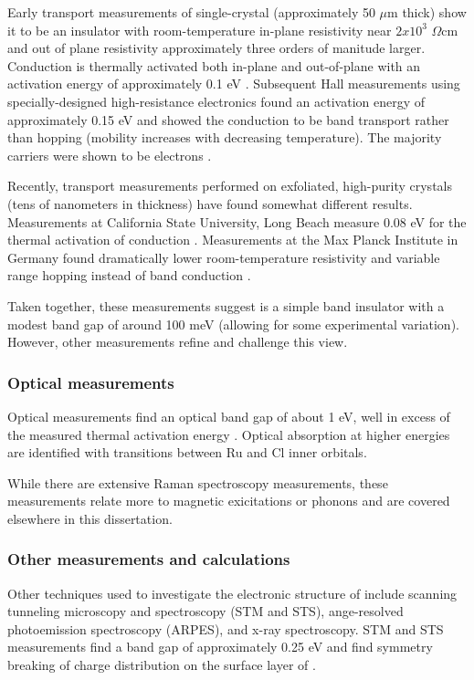 Early transport measurements of single-crystal \rucl (approximately 50 $\mu$m thick) show it to be an insulator with room-temperature in-plane resistivity near $2x10^{3}$ $\Omega$cm and out of plane resistivity approximately three orders of manitude larger. Conduction is thermally activated both in-plane and out-of-plane with an activation energy of approximately 0.1 eV \cite{Binotto1971}. Subsequent Hall measurements using specially-designed high-resistance electronics found an activation energy of approximately 0.15 eV and showed the conduction to be band transport rather than hopping (mobility increases with decreasing temperature). The majority carriers were shown to be electrons \cite{Rojas1983}.

Recently, transport measurements performed on exfoliated, high-purity \rucl crystals (tens of nanometers in thickness) have found somewhat different results. Measurements at California State University, Long Beach measure 0.08 eV for the thermal activation of conduction \cite{Kim2017}. Measurements at the Max Planck Institute in Germany found dramatically lower room-temperature resistivity and variable range hopping instead of band conduction \cite{Mashhadi2018}. 

Taken together, these measurements suggest \rucl is a simple band insulator with a modest band gap of around 100 meV (allowing for some experimental variation). However, other measurements refine and challenge this view.

\subsubsection{Optical measurements}
Optical measurements find an optical band gap of about 1 eV, well in excess of the measured thermal activation energy \cite{Sandilands2016}. Optical absorption at higher energies are identified with transitions between Ru and Cl inner orbitals.

While there are extensive Raman spectroscopy measurements, these measurements relate more to magnetic exicitations or phonons and are covered elsewhere in this dissertation.

\subsubsection{Other measurements and calculations}
Other techniques used to investigate the electronic structure of \rucl include scanning tunneling microscopy and spectroscopy (STM and STS), ange-resolved photoemission spectroscopy (ARPES), and x-ray spectroscopy. STM and STS measurements find a band gap of approximately 0.25 eV and find symmetry breaking of charge distribution on the surface layer of \rucl \cite{Ziatdinov2016}.

